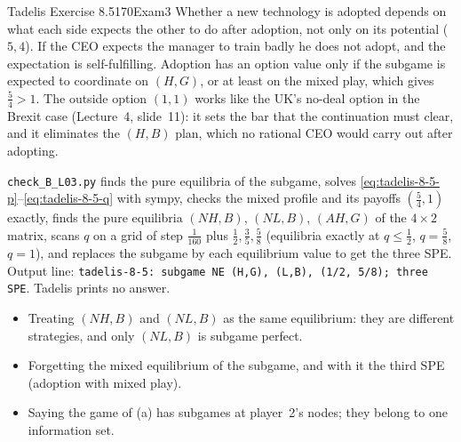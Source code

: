 \begin{exsol}{Tadelis Exercise 8.5}{170}{Exam}{3}
\interp Whether a new technology is adopted depends on what each side expects the other to do
after adoption, not only on its potential ($5,4$). If the CEO expects the manager to train badly
he does not adopt, and the expectation is self-fulfilling. Adoption has an option value only if
the subgame is expected to coordinate on $(H,G)$, or at least on the mixed play, which gives
$\frac54 > 1$. The outside option $(1,1)$ works like the UK's no-deal option in the Brexit case
(Lecture~4, slide~11): it sets the bar that the continuation must clear, and it eliminates the
$(H,B)$ plan, which no rational CEO would carry out after adopting.

\verify \texttt{check\_B\_L03.py} finds the pure equilibria of the subgame, solves
\eqref{eq:tadelis-8-5-p}--\eqref{eq:tadelis-8-5-q} with sympy, checks the mixed profile and its
payoffs $(\frac54, 1)$ exactly, finds the pure equilibria $(NH,B)$, $(NL,B)$, $(AH,G)$ of the
$4\times2$ matrix, scans $q$ on a grid of step $\frac1{160}$ plus $\frac12, \frac35, \frac58$
(equilibria exactly at $q \le \frac12$, $q = \frac58$, $q = 1$), and replaces the subgame by each
equilibrium value to get the three SPE. Output line: \texttt{tadelis-8-5: subgame NE (H,G), (L,B),
(1/2, 5/8); three SPE}. Tadelis prints no answer.

\mistakes
\begin{itemize}
  \item Treating $(NH, B)$ and $(NL, B)$ as the same equilibrium: they are different strategies,
  and only $(NL, B)$ is subgame perfect.
  \item Forgetting the mixed equilibrium of the subgame, and with it the third SPE (adoption with
  mixed play).
  \item Saying the game of (a) has subgames at player~2's nodes; they belong to one information
  set.
\end{itemize}

\end{exsol}
